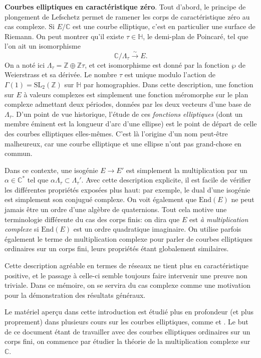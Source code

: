 \documentclass[11pt,a4paper]{article}
\newcommand{\Z}{\mathbb{Z}}
\newcommand{\C}{\mathbb{C}}
\renewcommand{\H}{\mathbb{H}}
\newcommand{\vers}{\longrightarrow}
\newcommand{\End}{\mathrm{End}}
\renewcommand{\v}{\vspace{5mm}}
\theoremstyle{definition}
\begin{document}
\v

\textbf{Courbes elliptiques en caractéristique zéro}. Tout d'abord, le principe de plongement de Lefschetz permet de ramener les corps de caractéristique zéro au cas complexe. Si $E/\C$ est une courbe elliptique, c'est en particulier une surface de Riemann. On peut montrer qu'il existe $\tau\in \H$, le demi-plan de Poincaré, tel que l'on ait un isomorphisme
$$\C/\Lambda_\tau \overset{\sim}{\vers} E.$$
On a noté ici $\Lambda_\tau = \Z\oplus \Z\tau$, et cet isomorphisme est donné par la fonction $\wp$ de Weierstrass et sa dérivée. Le nombre $\tau$ est unique modulo l'action de $\Gamma(1) = \mathrm{SL}_2(\Z)$ sur $\H$ par homographies. Dans cette description, une fonction sur $E$ à valeurs complexes est simplement une fonction méromorphe sur le plan complexe admettant deux périodes, données par les deux vecteurs d'une base de $\Lambda_\tau$. D'un point de vue historique, l'étude de ces \emph{fonctions elliptiques} (dont un membre éminent est la longueur d'arc d'une ellipse) est le point de départ de celle des courbes elliptiques elles-mêmes. C'est là l'origine d'un nom peut-être malheureux, car une courbe elliptique et une ellipse n'ont pas grand-chose en commun.

Dans ce contexte, une isogénie $E\vers E'$ est simplement la multiplication par un $\alpha\in \C^*$ tel que $\alpha \Lambda_\tau \subset \Lambda_\tau'$. Avec cette description explicite, il est facile de vérifier les différentes propriétés exposées plus haut: par exemple, le dual d'une isogénie est simplement son conjugué complexe. On voit également que $\End(E)$ ne peut jamais être un ordre d'une algèbre de quaternions. Tout cela motive une terminologie différente du cas des corps finis: on dira que $E$ est \emph{à multiplication complexe} si $\End(E)$ est un ordre quadratique imaginaire.
On utilise parfois également le terme de multiplication complexe pour parler de courbes elliptiques ordinaires sur un corps fini, leurs propriétés étant globalement similaires.

Cette description agréable en termes de réseaux ne tient plus en caractéristique positive, et le passage à celle-ci semble toujours faire intervenir une preuve non triviale. Dans ce mémoire, on se servira du cas complexe comme une motivation pour la démonstration des résultats généraux.

\v

Le matériel aperçu dans cette introduction est étudié plus en profondeur (et plus proprement) dans plusieurs cours sur les courbes elliptiques, comme \cite{Nekovar} et \cite{Stroh}.
Le but de ce document étant de travailler avec des courbes elliptiques ordinaires sur un corps fini, on commence par étudier la théorie de la multiplication complexe sur $\C$.
\end{document}
